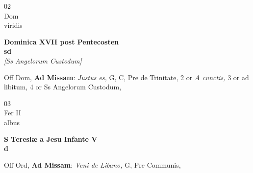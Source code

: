 \documentclass[10pt, openany]{book}
\begin{document}
        \begin{center}
            \begin{minipage}{3.5in}
                \vspace{2em}
                \begin{minipage}{0.5in}
                    {\Huge 02} \\
                    {\normalsize Dom} \\
                    {\normalsize viridis}
                \end{minipage}
                \begin{minipage}{3.0in}
                    \textbf{ \large Dominica XVII post Pentecosten \\
                    \textnormal{\normalsize sd}} \\ \textit{[Ss Angelorum Custodum]} \\ 
                \end{minipage}
                \begin{justify}Off Dom, \textbf{Ad Missam}: \textit{Justus es,} G, C, Pre de Trinitate, 2 or \textit{A cunctis,} 3 or ad libitum, 4 or Ss Angelorum Custodum,  
                \end{justify}
            \end{minipage}
        \end{center}
    
        \begin{center}
            \begin{minipage}{3.5in}
                \vspace{2em}
                \begin{minipage}{0.5in}
                    {\Huge 03} \\
                    {\normalsize Fer II} \\
                    {\normalsize albus}
                \end{minipage}
                \begin{minipage}{3.0in}
                    \textbf{ \large S Teresiæ a Jesu Infante V \\
                    \textnormal{\normalsize d}} \\ 
                \end{minipage}
                \begin{justify}Off Ord, \textbf{Ad Missam}: \textit{Veni de Libano,} G, Pre Communis,  
                \end{justify}
            \end{minipage}
        \end{center}
    
\end{document}
